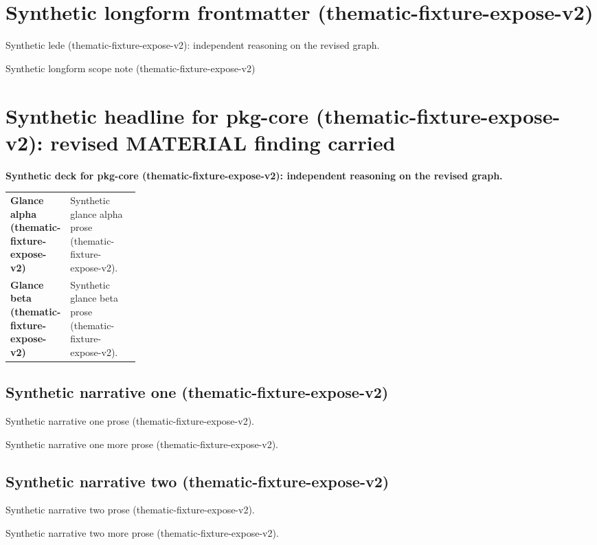 \documentclass[lualatex,a4paper,10pt]{jlreq}
\begin{document}
\surveycover
\clearpage
\section*{Synthetic longform frontmatter (thematic-fixture-expose-v2)}
Synthetic lede (thematic-fixture-expose-v2): independent reasoning on the revised graph.

\begin{claimboundary}
\noindent Synthetic longform scope note (thematic-fixture-expose-v2)\par
\end{claimboundary}
\medskip
\tableofcontents
\clearpage
\Needspace{0.24\textheight}
\section{Synthetic headline for pkg-core (thematic-fixture-expose-v2): revised MATERIAL finding carried}
\label{pkg:pkg-core}
\noindent\textbf{Synthetic deck for pkg-core (thematic-fixture-expose-v2): independent reasoning on the revised graph.} \cite{sp001lnd001}\par\medskip
\begin{themeoverview}
\begin{tabularx}{\linewidth}{@{}>{\bfseries}p{0.22\linewidth}X@{}}
Glance alpha (thematic-fixture-expose-v2) & Synthetic glance alpha prose (thematic-fixture-expose-v2). \cite{sp001lnd001} \\
Glance beta (thematic-fixture-expose-v2) & Synthetic glance beta prose (thematic-fixture-expose-v2). \cite{sp001lnd001} \\
\end{tabularx}
\end{themeoverview}
\medskip
\begin{multicols}{2}
\subsection*{Synthetic narrative one (thematic-fixture-expose-v2)}
\noindent Synthetic narrative one prose (thematic-fixture-expose-v2). \cite{sp001lnd001}\par\medskip
\noindent Synthetic narrative one more prose (thematic-fixture-expose-v2). \cite{sp001lnd001}\par\medskip
\subsection*{Synthetic narrative two (thematic-fixture-expose-v2)}
\noindent Synthetic narrative two prose (thematic-fixture-expose-v2). \cite{sp001lnd001}\par\medskip
\noindent Synthetic narrative two more prose (thematic-fixture-expose-v2). \cite{sp001lnd001}\par\medskip
\end{multicols}
\end{document}
